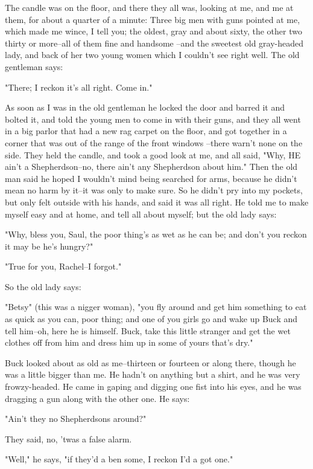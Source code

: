 The candle was on the floor, and there they all was, looking at me, and
me at them, for about a quarter of a minute:  Three big men with guns
pointed at me, which made me wince, I tell you; the oldest, gray and
about sixty, the other two thirty or more--all of them fine and handsome
--and the sweetest old gray-headed lady, and back of her two young women
which I couldn't see right well.  The old gentleman says:

"There; I reckon it's all right.  Come in."

As soon as I was in the old gentleman he locked the door and barred it
and bolted it, and told the young men to come in with their guns, and
they all went in a big parlor that had a new rag carpet on the floor, and
got together in a corner that was out of the range of the front windows
--there warn't none on the side.  They held the candle, and took a good
look at me, and all said, "Why, HE ain't a Shepherdson--no, there ain't
any Shepherdson about him."  Then the old man said he hoped I wouldn't
mind being searched for arms, because he didn't mean no harm by it--it
was only to make sure.  So he didn't pry into my pockets, but only felt
outside with his hands, and said it was all right.  He told me to make
myself easy and at home, and tell all about myself; but the old lady
says:

"Why, bless you, Saul, the poor thing's as wet as he can be; and don't
you reckon it may be he's hungry?"

"True for you, Rachel--I forgot."

So the old lady says:

"Betsy" (this was a nigger woman), "you fly around and get him something
to eat as quick as you can, poor thing; and one of you girls go and wake
up Buck and tell him--oh, here he is himself.  Buck, take this little
stranger and get the wet clothes off from him and dress him up in some of
yours that's dry."

Buck looked about as old as me--thirteen or fourteen or along there,
though he was a little bigger than me.  He hadn't on anything but a
shirt, and he was very frowzy-headed.  He came in gaping and digging one
fist into his eyes, and he was dragging a gun along with the other one.
He says:

"Ain't they no Shepherdsons around?"

They said, no, 'twas a false alarm.

"Well," he says, "if they'd a ben some, I reckon I'd a got one."

